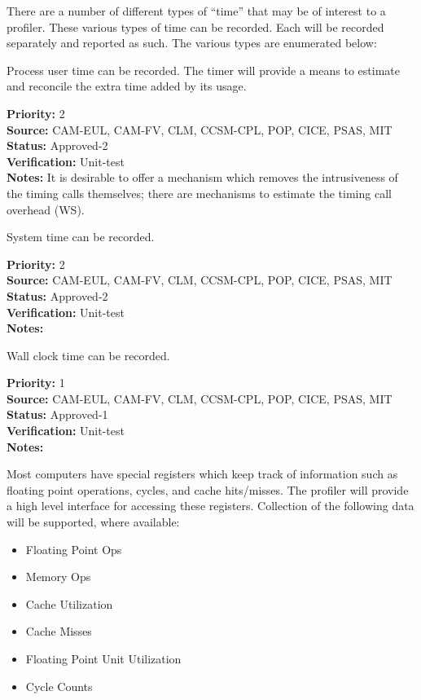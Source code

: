 
There are
a number of different types of ``time'' that may be of interest to a profiler.
These various types of time can be recorded.  Each will be recorded separately and reported
as such.  The various types are enumerated below:


Process user time can be recorded.
The timer will provide a means to estimate and reconcile the extra time added by its usage.

\begin{reqlist}
{\bf Priority:} 2 \\
{\bf Source:} CAM-EUL, CAM-FV, CLM, CCSM-CPL, POP, CICE, PSAS, MIT \\
{\bf Status:} Approved-2 \\
{\bf Verification:} Unit-test \\
{\bf Notes:} It is desirable to offer a mechanism which removes the
  intrusiveness of the timing calls themselves; there are mechanisms
  to estimate the timing call overhead (WS).
  
\end{reqlist}


System time can be recorded.

\begin{reqlist}
{\bf Priority:} 2 \\
{\bf Source:} CAM-EUL, CAM-FV, CLM, CCSM-CPL, POP, CICE, PSAS, MIT \\
{\bf Status:} Approved-2 \\
{\bf Verification:} Unit-test \\
{\bf Notes:} 
\end{reqlist}



Wall clock time can be recorded.

\begin{reqlist}
{\bf Priority:} 1 \\
{\bf Source:} CAM-EUL, CAM-FV, CLM, CCSM-CPL, POP, CICE, PSAS, MIT \\
{\bf Status:} Approved-1 \\
{\bf Verification:} Unit-test \\
{\bf Notes:} 
\end{reqlist}



Most computers have special registers which keep track of information such
as floating point operations, cycles, and cache hits/misses.  The profiler will
provide a high level interface for accessing these registers.
Collection of the following data will be supported, where available:
\begin{itemize}
\item{Floating Point Ops}
\item{Memory Ops}
\item{Cache Utilization}
\item{Cache Misses}
\item{Floating Point Unit Utilization}
\item{Cycle Counts}
\end{itemize}


